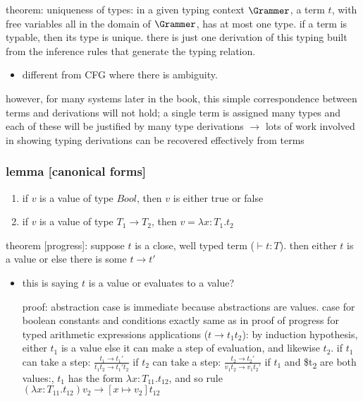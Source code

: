 \documentclass[11pt]{article}
\begin{document}
theorem: uniqueness of types: in a given typing context \(\Grammer\), a term \(t\), with free variables all in the domain of \(\Grammer\), has at most one type. if a term is typable, then its type is unique. there is just one derivation of this typing built from the inference rules that generate the typing relation.
\begin{itemize}
\item different from CFG where there is ambiguity.
\end{itemize}

however, for many systems later in the book, this simple correspondence between terms and derivations will not hold; a single term is assigned many types and each of these will be justified by many type derivations \(\rightarrow\) lots of work involved in showing typing derivations can be recovered effectively from terms

\subsubsection{lemma [canonical forms]}
\label{sec:orgf07e399}
\begin{enumerate}
\item if \(v\) is a value of type \(Bool\), then \(v\) is either true or false
\item if \(v\) is a value of type \(T_1 \rightarrow T_2\), then \(v = \lambda x: T_1.t_2\)
\end{enumerate}

theorem [progress]: suppose \(t\) is a close, well typed term (\(\vdash t: T\)). then either \(t\) is a value or else there is some \(t \rightarrow t'\)
\begin{itemize}
\item this is saying \(t\) is a value or evaluates to a value?

proof: abstraction case is immediate because abstractions are values. case for boolean constants and conditions exactly same as in proof of progress for typed arithmetic expressions
applications (\(t \rightarrow t_1 t_2\)): by induction hypothesis, either \(t_1\) is a value else it can make a step of evaluation, and likewise \(t_2\).
if \(t_1\) can take a step: \(\tfrac{t_1 \rightarrow t_1'}{t_1 t_2 \rightarrow t_1' t_2}\)
if \(t_2\) can take a step: \(\tfrac{t_2 \rightarrow t_2'}{v_1 t_2 \rightarrow v_1 t_2'}\)
if \(t_1\) and \$t\textsubscript{2} are both values:, \(t_1\) has the form \(\lambda x:T_{11}.t_{12}\),
and so rule \((\lambda x: T_{11}.t_{12}) v_2 \rightarrow [x \mapsto v_2]t_{12}\)
\end{itemize}
\end{document}
